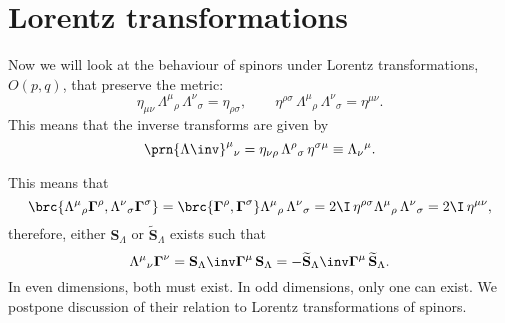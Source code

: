 \documentclass[11pt]{article}
\newcommand{\Gammab}{\boldsymbol{\Gamma}}
\renewcommand{\S}{\mathbf{S}}
\newcommand{\St}{\widetilde{\S}}
\begin{document}

\section{Lorentz transformations}\label{sec:lorentz}

Now we will look at the behaviour of spinors under Lorentz transformations, \(O(p,q)\), that preserve the metric:
%
\begin{equation}\label{eq:lorentz}
  \eta_{\mu\nu}\, \Lambda^\mu{}_\rho\, \Lambda^\nu{}_\sigma = \eta_{\rho\sigma},
  \qquad
  \eta^{\rho\sigma}\, \Lambda^\mu{}_\rho\, \Lambda^\nu{}_\sigma = \eta^{\mu\nu}.
\end{equation}
%
This means that the inverse transforms are given by
%
\begin{equation}\label{eq:invlorentz}
  \prn{\Lambda\inv}^\mu{}_\nu = \eta_{\nu\rho}\, \Lambda^\rho{}_\sigma\, \eta^{\sigma\mu}
  \equiv \Lambda_\nu{}^\mu.
\end{equation}
%

This means that 
%
\begin{equation*}
  \brc{\Lambda^\mu{}_\rho \Gammab^\rho, \Lambda^\nu{}_\sigma \Gammab^\sigma}
    = \brc{\Gammab^\rho, \Gammab^\sigma} \Lambda^\mu{}_\rho\, \Lambda^\nu{}_\sigma
    = 2 \I\, \eta^{\rho\sigma} \Lambda^\mu{}_\rho\, \Lambda^\nu{}_\sigma
    = 2 \I\, \eta^{\mu\nu},
\end{equation*}
%
therefore, either \(\S_\Lambda\) or \(\St_\Lambda\) exists such that
%
\begin{equation}\label{eq:spinlorentz}
  \Lambda^\mu{}_\nu \Gammab^\nu = \S_\Lambda\inv \Gammab^\mu\, \S_\Lambda
  = - \St_\Lambda\inv \Gammab^\mu\, \St_\Lambda.
\end{equation}
%
In even dimensions, both must exist.
In odd dimensions, only one can exist.
We postpone discussion of their relation to Lorentz transformations of spinors.
\end{document}
